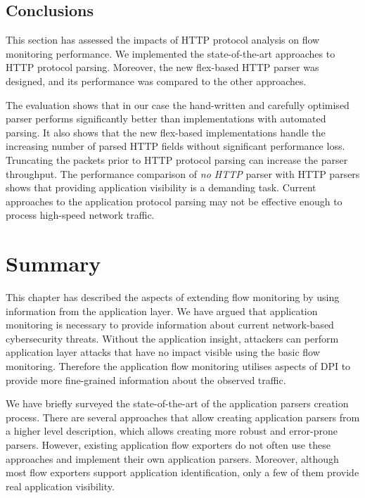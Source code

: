 \subsection{Conclusions} \label{subsec:http-conclusion}

This section has assessed the impacts of HTTP protocol analysis on flow monitoring performance. We implemented the state-of-the-art approaches to HTTP protocol parsing. Moreover, the new flex-based HTTP parser was designed, and its performance was compared to the other approaches.

The evaluation shows that in our case the hand-written and carefully optimised parser performs significantly better than implementations with automated parsing. It also shows that the new flex-based implementations handle the increasing number of parsed HTTP fields without significant performance loss. Truncating the packets prior to HTTP protocol parsing can increase the parser throughput. The performance comparison of \emph{no HTTP} parser with HTTP parsers shows that providing application visibility is a demanding task. Current approaches to the application protocol parsing may not be effective enough to process high-speed network traffic.

\section{Summary}\label{sec:app-summary}

This chapter has described the aspects of extending flow monitoring by using information from the application layer. We have argued that application monitoring is necessary to provide information about current network-based cybersecurity threats. Without the application insight, attackers can perform application layer attacks that have no impact visible using the basic flow monitoring. Therefore the application flow monitoring utilises aspects of DPI to provide more fine-grained information about the observed traffic. 

We have briefly surveyed the state-of-the-art of the application parsers creation process. There are several approaches that allow creating application parsers from a higher level description, which allows creating more robust and error-prone parsers. However, existing application flow exporters do not often use these approaches and implement their own application parsers. Moreover, although most flow exporters support application identification, only a few of them provide real application visibility. 

